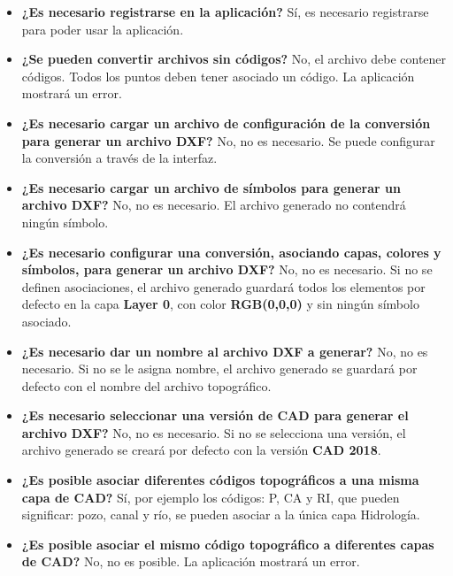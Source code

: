\begin{itemize}
\item \textbf{\textbf{¿Es necesario registrarse en la aplicación?}} Sí, es necesario registrarse para poder usar la aplicación.

\item \textbf{\textbf{¿Se pueden convertir archivos sin códigos?}} No, el archivo debe contener códigos. Todos los puntos deben tener asociado un código. La aplicación mostrará un error.

\item \textbf{\textbf{¿Es necesario cargar un archivo de configuración de la conversión para generar un archivo DXF?}} No, no es necesario. Se puede configurar la conversión a través de la interfaz.

\item \textbf{\textbf{¿Es necesario cargar un archivo de símbolos para generar un archivo DXF?}} No, no es necesario. El archivo generado no contendrá ningún símbolo.

\item \textbf{\textbf{¿Es necesario configurar una conversión, asociando capas, colores y símbolos, para generar un archivo DXF?}} No, no es necesario. Si no se definen asociaciones, el archivo generado guardará todos los elementos por defecto en la capa \textbf{Layer 0}, con color \textbf{RGB(0,0,0)} y sin ningún símbolo asociado.

\item \textbf{\textbf{¿Es necesario dar un nombre al archivo DXF a generar?}} No, no es necesario. Si no se le asigna nombre, el archivo generado se guardará por defecto con el nombre del archivo topográfico.

\item \textbf{\textbf{¿Es necesario seleccionar una versión de CAD para generar el archivo DXF?}} No, no es necesario. Si no se selecciona una versión, el archivo generado se creará por defecto con la versión \textbf{CAD 2018}.

\item \textbf{\textbf{¿Es posible asociar diferentes códigos topográficos a una misma capa de CAD?}} Sí, por ejemplo los códigos: P, CA y RI, que pueden significar: pozo, canal y río, se pueden asociar a la única capa Hidrología.

\item \textbf{\textbf{¿Es posible asociar el mismo código topográfico a diferentes capas de CAD?}} No, no es posible. La aplicación mostrará un error.


\end{itemize}

